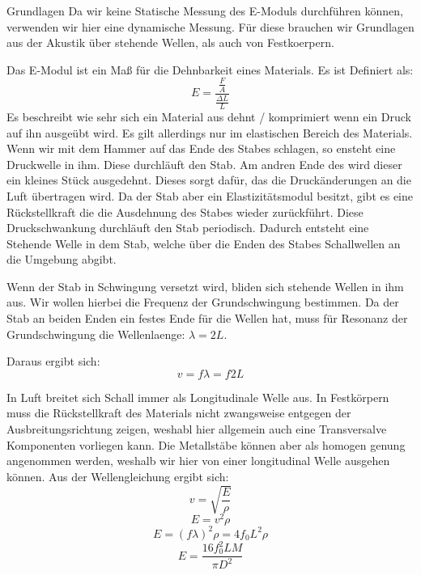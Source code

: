 \documentclass[twoside]{protokoll}
\begin{document}
\begin{aufgabe}{Grundlagen}
    Da wir keine Statische Messung des E-Moduls durchführen können, verwenden wir hier eine dynamische Messung.
    Für diese brauchen wir Grundlagen aus der Akustik über stehende Wellen, als auch von Festkoerpern.


    Das E-Modul ist ein Maß für die Dehnbarkeit eines Materials. Es ist Definiert als: 
    \begin{equation}
        E = \frac{\frac{F}{A}}{\frac{\Delta L}{L}}
    \end{equation}
    Es beschreibt wie sehr sich ein Material aus dehnt / komprimiert wenn ein Druck auf ihn ausgeübt wird.
    Es gilt allerdings nur im elastischen Bereich des Materials.\\
    
    Wenn wir mit dem Hammer auf das Ende des Stabes schlagen, so ensteht eine Druckwelle in ihm.
    Diese durchläuft den Stab. Am andren Ende des wird dieser ein kleines Stück ausgedehnt.
    Dieses sorgt dafür, das die Druckänderungen an die Luft übertragen wird.
    Da der Stab aber ein Elastizitätsmodul besitzt, gibt es eine Rückstellkraft die die Ausdehnung des Stabes wieder zurückführt.
    Diese Druckschwankung durchläuft den Stab periodisch.
    Dadurch entsteht eine Stehende Welle in dem Stab, welche über die Enden des Stabes Schallwellen an die Umgebung abgibt.

    Wenn der Stab in Schwingung versetzt wird, bliden sich stehende Wellen in ihm aus.
    Wir wollen hierbei die Frequenz der Grundschwingung bestimmen.
    Da der Stab an beiden Enden ein festes Ende für die Wellen hat, muss für Resonanz der Grundschwingung die Wellenlaenge: $\lambda = 2 L$. 
     
    Daraus ergibt sich:
    \begin{equation}
        v = f \lambda = f 2 L
    \end{equation}

    In Luft breitet sich Schall immer als Longitudinale Welle aus.
    In Festkörpern muss die Rückstellkraft des Materials nicht zwangsweise entgegen der Ausbreitungsrichtung zeigen, weshabl hier allgemein auch eine Transversalve Komponenten vorliegen kann.
    Die Metallstäbe können aber als homogen genung angenommen werden, weshalb wir hier von einer longitudinal Welle ausgehen können.
    Aus der Wellengleichung ergibt sich:
    \begin{equation}
         v = \sqrt{\frac{E}{\rho}}
    \end{equation}
    \begin{equation}
         E = v ^2 \rho
    \end{equation}
    \begin{equation}
        E = (f \lambda)^2 \rho = 4 f_0 L ^2 \rho
    \end{equation}
    \begin{equation}
        E = \frac{ 16 f_0^2 L M}{\pi D ^2}
    \end{equation}

     
\end{aufgabe}
\end{document}
